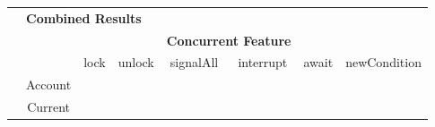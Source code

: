 \documentclass[a4paper,12pt]{article}
\begin{document}
\begin{table}[hp!]
\hspace{-1cm}
\begin{tabular}{lcllllll}
                                                                                                                 & \multicolumn{3}{l}{\textbf{Combined Results}}                                                                                  &                                               &                                               &                                               &                                               \\
                                                                                                                 & \multicolumn{1}{l}{}           & \multicolumn{1}{c}{\textbf{}}                 & \textbf{}                                     & \multicolumn{2}{c}{\textbf{Concurrent Feature}}                                               &                                               &                                               \\ \cline{3-8} 
                                                                                                                 & \multicolumn{1}{l|}{\textbf{}} & \multicolumn{1}{c|}{lock}                     & \multicolumn{1}{c|}{unlock}                   & \multicolumn{1}{c|}{signalAll}                & \multicolumn{1}{c|}{interrupt}                & \multicolumn{1}{c|}{await}                    & \multicolumn{1}{c|}{newCondition}             \\ \cline{2-8} 
\multicolumn{1}{c|}{\textbf{}}                                                                                   & \multicolumn{1}{c|}{Account}   & \multicolumn{1}{l|}{\cellcolor[HTML]{32CB00}} & \multicolumn{1}{l|}{\cellcolor[HTML]{32CB00}} & \multicolumn{1}{l|}{\cellcolor[HTML]{FE0000}} & \multicolumn{1}{l|}{}                         & \multicolumn{1}{l|}{}                         & \multicolumn{1}{l|}{\cellcolor[HTML]{32CB00}} \\ \cline{2-8} 
\multicolumn{1}{c|}{}                                                                                            & \multicolumn{1}{c|}{Current}   & \multicolumn{1}{l|}{\cellcolor[HTML]{32CB00}} & \multicolumn{1}{l|}{\cellcolor[HTML]{32CB00}} & \multicolumn{1}{l|}{}                         & \multicolumn{1}{l|}{\cellcolor[HTML]{32CB00}} & \multicolumn{1}{l|}{\cellcolor[HTML]{31A4FF}} & \multicolumn{1}{l|}{}                         \\ \cline{2-8} 

\end{tabular}
\end{table}
\end{document}
